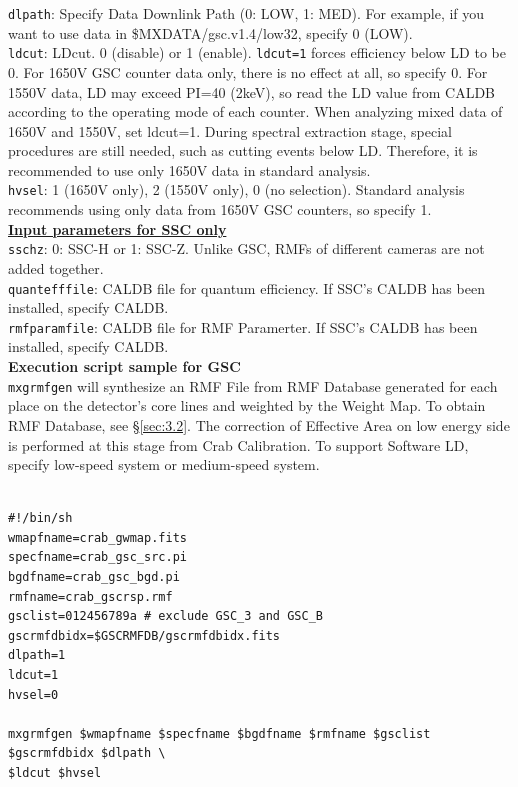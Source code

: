 \documentclass[10pt]{report}
\renewcommand{\_}{\textscale{.5}{\textbf{\textunderscore}}}
\begin{document}
\noindent\texttt{dlpath}: Specify Data Downlink Path (0: LOW, 1: MED). For example, if you want to use data in \$MXDATA/gsc.v1.4/low32, specify 0 (LOW). \\

\noindent\texttt{ldcut}: LDcut. 0 (disable) or 1 (enable). \texttt{ldcut=1} forces efficiency below LD to be 0. For 1650V GSC counter data only, there is no effect at all, so specify 0. For 1550V data, LD may exceed PI=40 (2keV), so read the LD value from CALDB according to the operating mode of each counter. When analyzing mixed data of 1650V and 1550V, set ldcut=1. During spectral extraction stage, special procedures are still needed, such as cutting events below LD. Therefore, it is recommended to use only 1650V data in standard analysis. \\

\noindent\texttt{hvsel}: 1 (1650V only), 2 (1550V only), 0 (no selection). Standard analysis recommends using only data from 1650V GSC counters, so specify 1. \\

\noindent\underline{\textbf{Input parameters for SSC only}} \\

\noindent\texttt{sschz}: 0: SSC-H or 1: SSC-Z. Unlike GSC, RMFs of different cameras are not added together. \\

\noindent\texttt{quantefffile}: CALDB file for quantum efficiency. If SSC's CALDB has been installed, specify CALDB. \\

\noindent\texttt{rmfparamfile}: CALDB file for RMF Paramerter. If SSC's CALDB has been installed, specify CALDB. \\

\noindent\textbf{Execution script sample for GSC} \\

\texttt{mxgrmfgen} will synthesize an RMF File from RMF Database generated for each place on the detector's core lines and weighted by the Weight Map. To obtain RMF Database, see \S\ref{sec:3.2}. The correction of Effective Area on low energy side is performed at this stage from Crab Calibration. To support Software LD, specify low-speed system or medium-speed system. \\

\begin{lstlisting}[frame=single]

#!/bin/sh
wmapfname=crab_gwmap.fits
specfname=crab_gsc_src.pi
bgdfname=crab_gsc_bgd.pi
rmfname=crab_gscrsp.rmf
gsclist=012456789a # exclude GSC_3 and GSC_B
gscrmfdbidx=$GSCRMFDB/gscrmfdbidx.fits
dlpath=1
ldcut=1
hvsel=0

mxgrmfgen $wmapfname $specfname $bgdfname $rmfname $gsclist $gscrmfdbidx $dlpath \
$ldcut $hvsel

\end{lstlisting}
\end{document}
